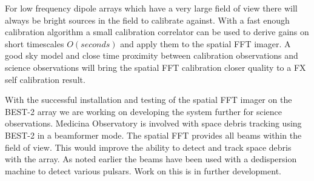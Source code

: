 \documentclass[useAMS,macros,usenatbib]{mn2e}
\begin{document}
For low frequency dipole arrays which have a very large field of view there will always be bright sources in the field to calibrate against.
With a fast enough calibration algorithm a small calibration correlator can be used to derive gains on short timescales $O(seconds)$ and apply them to the spatial FFT imager.
A good sky model and close time proximity between calibration observations and science observations will bring the spatial FFT calibration closer quality to a FX self calibration result.

With the successful installation and testing of the spatial FFT imager on the BEST-2 array we are working on developing the system further for science observations.
Medicina Observatory is involved with space debris tracking using BEST-2 in a beamformer mode.
The spatial FFT provides all beams within the field of view.
This would improve the ability to detect and track space debris with the array.
As noted earlier the beams have been used with a dedispersion machine to detect various pulsars.
Work on this is in further development.

\end{document}
